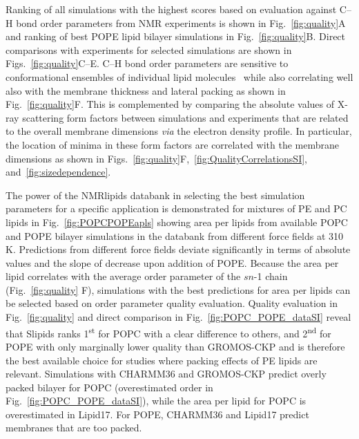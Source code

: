 \documentclass[fleqn,10pt]{wlscirep}
\begin{document}
Ranking of all simulations with the highest scores based on evaluation against C--H bond order parameters from NMR experiments is shown in Fig.~\ref{fig:quality}A and ranking of best POPE lipid bilayer simulations in Fig.~\ref{fig:quality}B. Direct comparisons with experiments for selected simulations are shown in Figs.~\ref{fig:quality}C--E. C--H bond order parameters are sensitive to conformational ensembles of individual lipid molecules~\cite{ollila16} while also correlating well also with the membrane thickness and lateral packing as shown in Fig.~\ref{fig:quality}F. This is complemented by comparing the absolute values of X-ray scattering form factors between simulations and experiments that are related to the overall membrane dimensions \textit{via} the electron density profile. In particular, the location of minima in these form factors are correlated with the membrane dimensions as shown in Figs.~\ref{fig:quality}F,~\ref{fig:QualityCorrelationsSI}, and~\ref{fig:sizedependence}.

The power of the NMRlipids databank in selecting the best simulation parameters for a specific application is demonstrated for mixtures of PE and PC lipids in Fig.~\ref{fig:POPCPOPEapls} showing area per lipids from available POPC and POPE bilayer simulations in the databank from different force fields at 310\,K. Predictions from different force fields deviate significantly in terms of absolute values and the slope of decrease upon addition of POPE. Because the area per lipid correlates with the average order parameter of the $\textit{sn}$-1 chain (Fig.~\ref{fig:quality} F), simulations with the best predictions for area per lipids can be selected based on order parameter quality evaluation. Quality evaluation in Fig.~\ref{fig:quality} and direct comparison in Fig.~\ref{fig:POPC_POPE_dataSI} reveal that Slipids ranks 1\textsuperscript{st} for POPC with a clear difference to others, and 2\textsuperscript{nd} for POPE with only marginally lower quality than GROMOS-CKP and is therefore the best available choice for studies where packing effects of PE lipids are relevant. Simulations with CHARMM36 and GROMOS-CKP predict overly packed bilayer for POPC (overestimated order in Fig.~\ref{fig:POPC_POPE_dataSI}), while the area per lipid for POPC is overestimated in Lipid17. For POPE, CHARMM36 and Lipid17 predict membranes that are too packed. 
\end{document}
